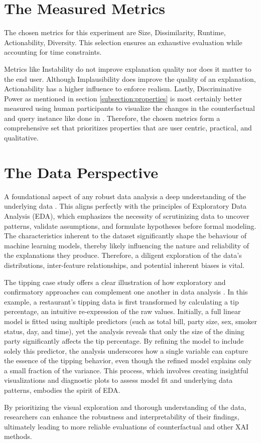 \section{The Measured Metrics \label{sec:measured-metrics}}

The chosen metrics for this experiment are Size, Dissimilarity, Runtime, Actionability, Diversity. This selection ensures an exhaustive evaluation while accounting for time constraints.

Metrics like Instability do not improve explanation quality nor does it matter to the end user. Although Implausibility does improve the quality of an explanation, Actionability has a higher influence to enforce realism. Lastly, Discriminative Power as mentioned in section \ref{subsection:properties} is most certainly better measured using human participants to visualize the changes in the counterfactual and query instance like done in \citet{forrest2021contrastive}. Therefore, the chosen metrics form a comprehensive set that prioritizes properties that are user centric, practical, and qualitative.

\section{The Data Perspective}
A foundational aspect of any robust data analysis a deep understanding of the underlying data \citep{tukey1977exploratory}. This aligns perfectly with the principles of Exploratory Data Analysis (EDA), which emphasizes the necessity of scrutinizing data to uncover patterns, validate assumptions, and formulate hypotheses before formal modeling. The characteristics inherent to the dataset significantly shape the behaviour of machine learning models, thereby likely influencing the nature and reliability of the explanations they produce. Therefore, a diligent exploration of the data's distributions, inter-feature relationships, and potential inherent biases is vital.

The tipping case study offers a clear illustration of how exploratory and confirmatory approaches can complement one another in data analysis \citep{cook2025}. In this example, a restaurant’s tipping data is first transformed by calculating a tip percentage, an intuitive re-expression of the raw values. Initially, a full linear model is fitted using multiple predictors (such as total bill, party size, sex, smoker status, day, and time), yet the analysis reveals that only the size of the dining party significantly affects the tip percentage. By refining the model to include solely this predictor, the analysis underscores how a single variable can capture the essence of the tipping behavior, even though the refined model explains only a small fraction of the variance. This process, which involves creating insightful visualizations and diagnostic plots to assess model fit and underlying data patterns, embodies the spirit of EDA.

By prioritizing the visual exploration and thorough understanding of the data, researchers can enhance the robustness and interpretability of their findings, ultimately leading to more reliable evaluations of counterfactual and other XAI methods.

